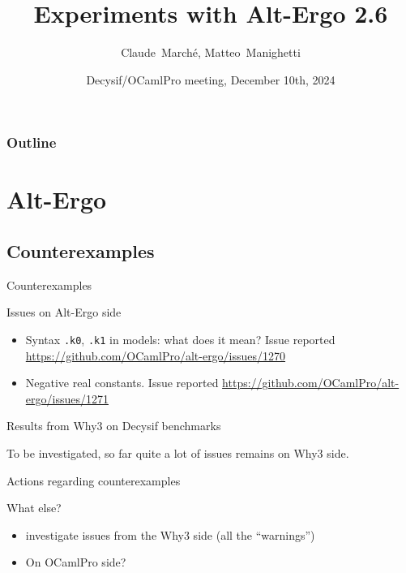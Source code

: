 \documentclass[aspectratio=169]{beamer}
\title{Experiments with Alt-Ergo 2.6}
\author{Claude~Marché, Matteo~Manighetti}
\date{Decysif/OCamlPro meeting, December 10th, 2024}
\begin{document}

\begin{frame}{}
  \maketitle
\end{frame}

\begin{frame}
  \frametitle{Outline}
  \tableofcontents
\end{frame}


\section{Alt-Ergo}

\subsection{Counterexamples}

\begin{frame}{Counterexamples}

  \begin{block}{Issues on Alt-Ergo side}
  \begin{itemize}
  \item Syntax \texttt{.k0}, \texttt{.k1} in models: what does it
    mean? Issue reported
    \url{https://github.com/OCamlPro/alt-ergo/issues/1270}
  \item Negative real constants. Issue reported \url{https://github.com/OCamlPro/alt-ergo/issues/1271}
  \end{itemize}
\end{block}
\vfill
\begin{block}{Results from Why3 on Decysif benchmarks}

    To be investigated, so far quite a lot of issues remains on Why3
    side.

  \end{block}
\end{frame}

\begin{frame}{Actions regarding counterexamples}

  What else?
  \begin{itemize}
  \item investigate issues from the Why3 side (all the ``warnings'')
  \item On OCamlPro side?
  \end{itemize}

\end{frame}
\end{document}
